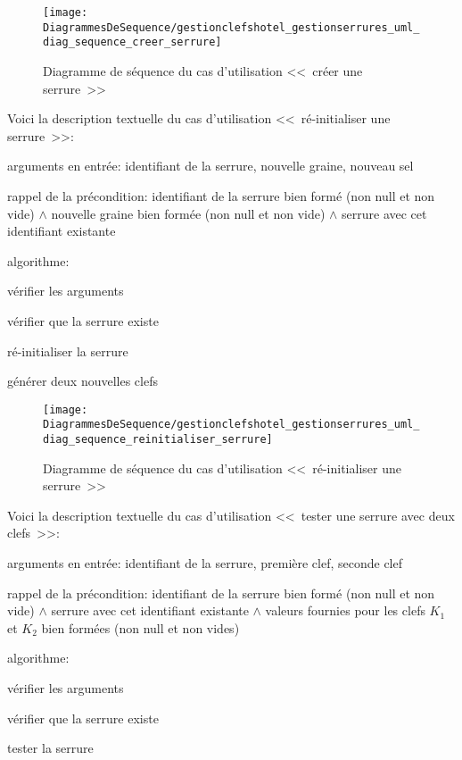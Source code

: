 \documentclass[11pt,article]{article}
\newcommand{\nullvalue}{\textsf{null}\xspace}
\begin{document}
\begin{figure}[ht!]
\begin{center}
\texttt{[image: DiagrammesDeSequence/gestionclefshotel\_gestionserrures\_uml\_diag\_sequence\_creer\_serrure]}
\caption{Diagramme de séquence du cas d'utilisation <<~créer une serrure~>>}
\end{center}
\label{umlet_diag_sequence_creer_serrure}
\end{figure}

\newpage

Voici la description textuelle du cas d'utilisation <<~ré-initialiser une serrure~>>:
\begin{compactitem}
\item arguments en entrée: identifiant de la serrure, nouvelle graine,
  nouveau sel
\item rappel de la précondition: identifiant de la serrure bien formé
  (non \nullvalue et non vide) $\land$ nouvelle graine bien formée
  (non \nullvalue et non vide) $\land$ serrure avec cet identifiant
  existante
\item algorithme:
\begin{compactenum}
\item vérifier les arguments
\item vérifier que la serrure existe
\item ré-initialiser la serrure
  \begin{compactitem}
  \item générer deux nouvelles clefs
  \end{compactitem}
\end{compactenum}
\end{compactitem}

\begin{figure}[ht!]
\begin{center}
\texttt{[image: DiagrammesDeSequence/gestionclefshotel\_gestionserrures\_uml\_diag\_sequence\_reinitialiser\_serrure]}
\caption{Diagramme de séquence du cas d'utilisation <<~ré-initialiser une serrure~>>}
\end{center}
\label{umlet_diag_sequence_reinitialiser_serrure}
\end{figure}

\newpage

Voici la description textuelle du cas d'utilisation <<~tester une
serrure avec deux clefs~>>:
\begin{compactitem}
\item arguments en entrée: identifiant de la serrure, première clef,
  seconde clef
\item rappel de la précondition: identifiant de la serrure bien formé
  (non \nullvalue et non vide) $\land$ serrure avec cet identifiant
  existante $\land$ valeurs fournies pour les clefs $K_1$ et $K_2$
  bien formées (non \nullvalue et non vides)
\item algorithme:
\begin{compactenum}
\item vérifier les arguments
\item vérifier que la serrure existe
\item tester la serrure
\end{compactenum}
\end{compactitem}
\end{document}
